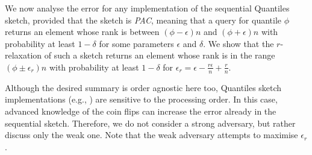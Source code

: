 We now analyse the error for any implementation of the sequential Quantiles sketch, provided that the sketch is
\emph{PAC}, meaning that a query for quantile $\phi$
returns an element whose rank is between $(\phi-\epsilon)n$ and $(\phi+\epsilon)n$ with 
probability at least $1-\delta$ for some parameters $\epsilon$ and $\delta$. We show that the $r$-relaxation of
such a sketch returns an element whose rank is in the range $(\phi \pm\epsilon_r)n$ with probability at
least $1-\delta$ for $\epsilon_r=\epsilon - \frac{r \epsilon}{n} + \frac{r}{n}$.


Although the desired summary is order agnostic here too, Quantiles sketch implementations (e.g., \cite{Agarwal:2012})
are sensitive to the processing order. In this case, advanced knowledge of the coin flips can increase the error
already in the sequential sketch. Therefore, we do not consider a strong adversary, but rather discuss only the weak one.
Note that the weak adversary attempts to maximise $\epsilon_r$.

